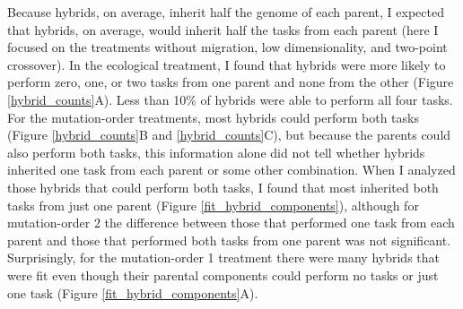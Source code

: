 \begin{doublespace}
Because hybrids, on average, inherit half the genome of each parent,
I expected that hybrids, on average, would inherit half the tasks
from each parent (here I focused on the treatments without migration,
low dimensionality, and two-point crossover).
%
In the ecological treatment, I found that hybrids were more likely to perform
zero, one, or two tasks from one parent and none from the other
(Figure \ref{hybrid_counts}A).
%
Less than 10\% of hybrids were able to perform all four tasks.
%
For the mutation-order treatments,
most hybrids could perform both tasks
(Figure \ref{hybrid_counts}B and \ref{hybrid_counts}C),
but because the parents could also perform both tasks,
this information alone did not tell whether hybrids inherited
one task from each parent or some other combination.
%
When I analyzed those hybrids that could perform both tasks,
I found that most inherited both tasks from just one parent
(Figure \ref{fit_hybrid_components}),
although for mutation-order 2
the difference between those
that performed one task from each parent
and those that performed both tasks from one parent
was not significant.
%
Surprisingly, for the mutation-order 1 treatment
there were many hybrids that were fit
even though their parental components
could perform no tasks or just one task
(Figure \ref{fit_hybrid_components}A).




\end{doublespace}
